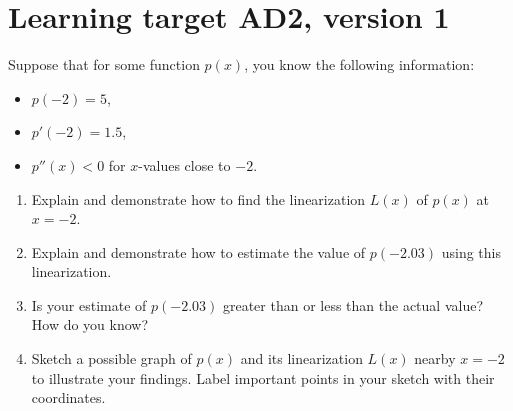 \pagebreak

\section{Learning target AD2, version 1}
Suppose that for some function \(p(x)\), you know the following information:
\begin{itemize}
    \item \(p(-2) = 5\),
    \item \(p'(-2) = 1.5\), 
    \item \(p''(x) < 0\) for \(x\)-values close to \(-2\). 
\end{itemize}

\begin{enumerate}[leftmargin=0pt]
    \item Explain and demonstrate how to find the linearization \(L(x)\) of \(p(x)\) at \(x =-2\). 
    \vfill
    \item Explain and demonstrate how to estimate the value of \(p(-2.03)\) using this linearization. 
    
    \vfill
    \item Is your estimate of \(p(-2.03)\) greater than or less than the actual value? How do you know?
    
    \vfill
    \item Sketch a possible graph of \(p(x)\) and its linearization \(L(x)\) nearby \(x =-2\) to illustrate your findings. Label important points in your sketch with their coordinates.
    
    \vfill
\end{enumerate}

